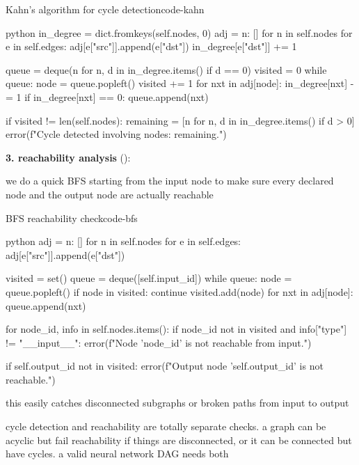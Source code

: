 \documentclass{nngraph-en}
\begin{document}
\begin{codebox}{Kahn's algorithm for cycle detection}{code-kahn}
\begin{amzcode}{python}
in_degree = dict.fromkeys(self.nodes, 0)
adj       = {n: [] for n in self.nodes}
for e in self.edges:
    adj[e["src"]].append(e["dst"])
    in_degree[e["dst"]] += 1

queue   = deque(n for n, d in in_degree.items() if d == 0)
visited = 0
while queue:
    node = queue.popleft()
    visited += 1
    for nxt in adj[node]:
        in_degree[nxt] -= 1
        if in_degree[nxt] == 0:
            queue.append(nxt)

if visited != len(self.nodes):
    remaining = [n for n, d in in_degree.items() if d > 0]
    error(f"Cycle detected involving nodes: {remaining}.")
\end{amzcode}
\end{codebox}

\textbf{3. reachability analysis} ():

we do a quick BFS starting from the input node to make sure every declared node and the output node are actually reachable

\begin{codebox}{BFS reachability check}{code-bfs}
\begin{amzcode}{python}
adj = {n: [] for n in self.nodes}
for e in self.edges:
    adj[e["src"]].append(e["dst"])

visited = set()
queue   = deque([self.input_id])
while queue:
    node = queue.popleft()
    if node in visited:
        continue
    visited.add(node)
    for nxt in adj[node]:
        queue.append(nxt)

for node_id, info in self.nodes.items():
    if node_id not in visited and info["type"] != "__input__":
        error(f"Node '{node_id}' is not reachable from input.")

if self.output_id not in visited:
    error(f"Output node '{self.output_id}' is not reachable.")
\end{amzcode}
\end{codebox}

this easily catches disconnected subgraphs or broken paths from input to output

\begin{notebox}
cycle detection and reachability are totally separate checks. a graph can be acyclic but fail reachability if things are disconnected, or it can be connected but have cycles. a valid neural network DAG needs both
\end{notebox}
\end{document}
